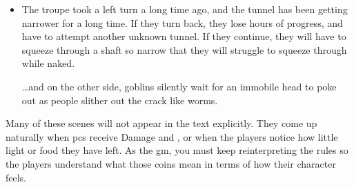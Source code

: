 \begin{multicols}{2}
\begin{itemize}
	\begin{speechtext}
		``We should follow the tracks, so we avoid dead-ends.''
	\end{speechtext}
	There is a lot to discuss, but limited time.%
	\footnote{If you want to guarantee that this chapter takes precisely one evening, you might want to set a timer.
	If you have a tall candle, you can drive three nails into it, to indicate four  passing.
	Of course, if the troupe split into two, you may need to add an extra candle to the evening.}
	\item
	The troupe took a left turn a long time ago, and the tunnel has been getting narrower for a long time.
	If they turn back, they lose hours of progress, and have to attempt another unknown tunnel.
	If they continue, they will have to squeeze through a shaft so narrow that they will struggle to squeeze through while naked.

	\ldots and on the other side, goblins silently wait for an immobile head to poke out as people slither out the crack like worms.
\end{itemize}

Many of these scenes will not appear in the text explicitly.
They come up naturally when \glspl{pc} receive Damage and , or when the players notice how little light or food they have left.
As the \gls{gm}, you must keep reinterpreting the rules so the players understand what those  coins mean in terms of how their character feels.

\end{multicols}
